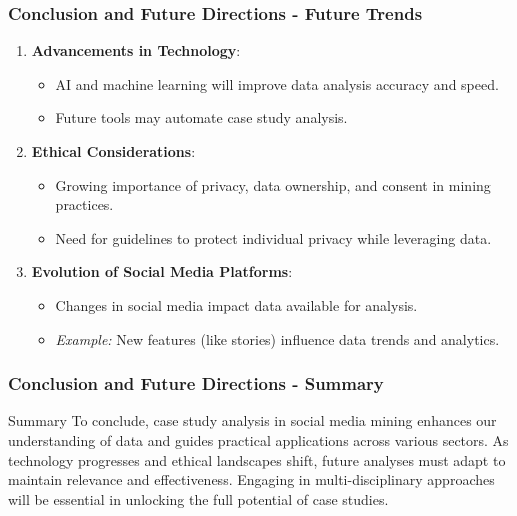\documentclass{beamer}
\begin{document}
\begin{frame}[fragile]
    \frametitle{Conclusion and Future Directions - Future Trends}

    \begin{enumerate}
        \item \textbf{Advancements in Technology}:
        \begin{itemize}
            \item AI and machine learning will improve data analysis accuracy and speed.
            \item Future tools may automate case study analysis.
        \end{itemize}

        \item \textbf{Ethical Considerations}:
        \begin{itemize}
            \item Growing importance of privacy, data ownership, and consent in mining practices.
            \item Need for guidelines to protect individual privacy while leveraging data.
        \end{itemize}

        \item \textbf{Evolution of Social Media Platforms}:
        \begin{itemize}
            \item Changes in social media impact data available for analysis.
            \item \textit{Example:} New features (like stories) influence data trends and analytics.
        \end{itemize}
    \end{enumerate}
\end{frame}

\begin{frame}[fragile]
    \frametitle{Conclusion and Future Directions - Summary}

    \begin{block}{Summary}
        To conclude, case study analysis in social media mining enhances our understanding of data and guides practical applications across various sectors. 
        As technology progresses and ethical landscapes shift, future analyses must adapt to maintain relevance and effectiveness. 
        Engaging in multi-disciplinary approaches will be essential in unlocking the full potential of case studies.
    \end{block}
\end{frame}
\end{document}
